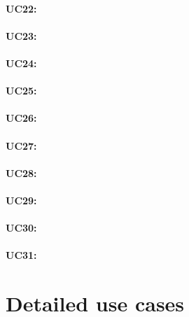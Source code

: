 \paragraph{UC22: }
\paragraph{UC23: }
\paragraph{UC24: }
\paragraph{UC25: }
\paragraph{UC26: }
\paragraph{UC27: }
\paragraph{UC28: }
\paragraph{UC29: }
\paragraph{UC30: }
\paragraph{UC31: }

\section{Detailed use cases}

